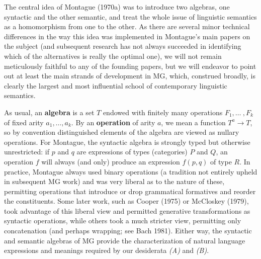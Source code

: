 The central idea of Montague (1970a) was to introduce two algebras, one
syntactic and the other semantic, and treat the whole issue of linguistic
semantics as a homomorphism from one to the other. As
there are several minor technical differences in the way this idea was
implemented in Montague's main papers on the subject (and subsequent research
has not always succeeded in identifying which of the alternatives is really
the optimal one), we will not remain meticulously faithful to any of the
founding papers, but we will endeavor to point out at least the main strands
of development in MG, which, construed broadly, is clearly the largest and
most influential school of contemporary linguistic semantics. 

As usual, an {\bf algebra} is a set $T$ endowed with finitely
many operations $F_1, \ldots\ ,F_k$ of fixed arity $a_1, \ldots ,a_k$. By an
{\bf operation} of arity $a$, we mean a function $T^a
\rightarrow T$, so by convention distinguished elements of the algebra are
viewed as nullary operations. For Montague, the syntactic algebra is strongly
typed but otherwise unrestricted: if $p$ and $q$ are expressions of types
(categories) $P$ and $Q$, an operation $f$ will always (and only) produce an
expression $f(p,q)$ of type $R$. In practice, Montague always used binary
operations (a tradition not entirely upheld in subsequent MG work) and was
very liberal as to the nature of these, permitting operations that introduce
or drop grammatical formatives and reorder the constituents. Some later work,
such as Cooper (1975)\nocite{Cooper:1975} or McCloskey (1979),
\nocite{McCloskey:1979} took advantage of this liberal view and permitted
generative transformations as syntactic operations, while others took a much
stricter view, permitting only concatenation (and perhaps wrapping; see Bach
1981).\nocite{Bach:1981} Either way, the syntactic and semantic algebras of
MG provide the characterization of natural language expressions and meanings
required by our desiderata {\sl (A)} and {\sl (B)}.

